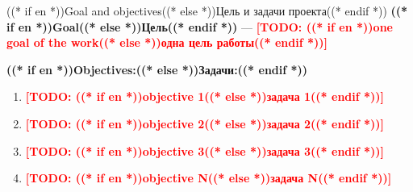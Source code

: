 \documentclass[aspectratio=169, 14pt]{beamer}
\newcommand{\todo}[1]{\textcolor{red}{\textbf{[TODO: #1]}}}
\begin{document}
\begin{frame}{((* if en *))Goal and objectives((* else *))Цель и задачи проекта((* endif *))}
  \textcolor{hseblue}{\textbf{((* if en *))Goal((* else *))Цель((* endif *))}} — \todo{((* if en *))one goal of the work((* else *))одна цель работы((* endif *))}

  \vspace{0.5em}
  {\color{hseblue}\textbf{((* if en *))Objectives:((* else *))Задачи:((* endif *))}}
  \begin{enumerate}
    \item \todo{((* if en *))objective 1((* else *))задача 1((* endif *))}
    \item \todo{((* if en *))objective 2((* else *))задача 2((* endif *))}
    \item \todo{((* if en *))objective 3((* else *))задача 3((* endif *))}
    \item \todo{((* if en *))objective N((* else *))задача N((* endif *))}
  \end{enumerate}
\end{frame}
\end{document}
